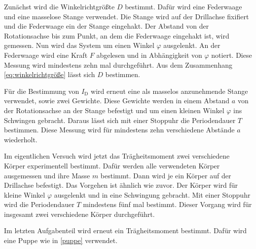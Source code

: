 Zunächst wird die Winkelrichtgrößte $D$ bestimmt. 
Dafür wird eine Federwaage und eine masselose Stange verwendet.
Die Stange wird auf der Drillachse fixifiert und die Federwaage ein der Stange eingehakt. 
Der Abstand von der Rotationsachse bis zum Punkt, an dem die Federwaage eingehakt ist, wird gemessen.
Nun wird das System um einen Winkel $\varphi$ ausgelenkt. 
An der Federwaage wird eine Kraft $F$ abgelesen und in Abhängigkeit von $\varphi$ notiert. 
Diese Messung wird mindestens zehn mal durchgeführt. 
Aus dem Zusammenhang \autoref{eq:winkelrichtgröße} lässt sich $D$ bestimmen.

Für die Bestimmung von $I_\text{D}$ wird erneut eine als masselos anzunehmende Stange verwendet, sowie zwei Gewichte.
Diese Gewichte werden in einem Abstand $a$ von der Rotationsachse an der Stange befestigt und um einen kleinen Winkel $\varphi$ ins Schwingen gebracht. 
Daraus lässt sich mit einer Stoppuhr die Periodendauer $T$ bestimmen. 
Diese Messung wird für mindestens zehn verschiedene Abstände $a$ wiederholt. 

Im eigentlichen Versuch wird jetzt das Trägheitsmoment zwei verschiedene Körper experimentell bestimmt. 
Dafür werden alle verwendeten Körper ausgemessen und ihre Masse $m$ bestimmt. 
Dann wird je ein Körper auf der Drillachse befestigt. 
Das Vorgehen ist ähnlich wie zuvor. 
Der Körper wird für kleine Winkel $\varphi$ ausgelenkt und in eine Schwingung gebracht. 
Mit einer Stoppuhr wird die Periodendauer $T$ mindestens fünf mal bestimmt. 
Dieser Vorgang wird für insgesamt zwei verschiedene Körper durchgeführt.

Im letzten Aufgabenteil wird erneut ein Trägheitsmoment bestimmt. Dafür wird eine Puppe wie in \autoref{puppe} verwendet.

